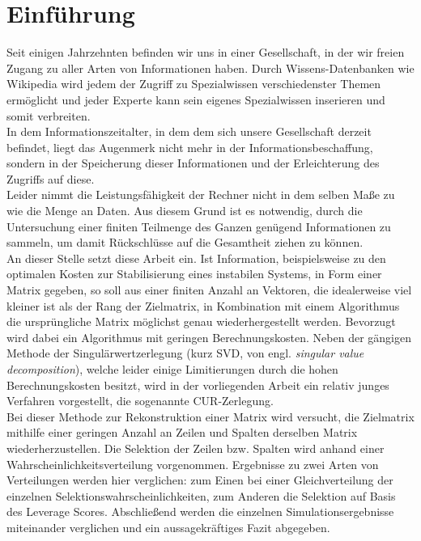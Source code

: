\documentclass[12pt,a4paper,twoside]{article}
\begin{document}
\newpage
\tableofcontents
\newpage

\pagestyle{headings}

\section{Einführung}
	Seit einigen Jahrzehnten befinden wir uns in einer Gesellschaft, in der wir freien Zugang zu aller Arten von 
	Informationen haben. Durch Wissens-Datenbanken wie Wikipedia wird jedem der Zugriff zu Spezialwissen verschiedenster Themen ermöglicht und jeder Experte kann sein eigenes Spezialwissen inserieren und somit verbreiten.
	\\
	In dem Informationszeitalter, in dem dem sich unsere Gesellschaft derzeit befindet, liegt das Augenmerk nicht 
	mehr in der Informationsbeschaffung, sondern in der Speicherung dieser Informationen und der Erleichterung des 
	Zugriffs auf diese. \\
	Leider nimmt die Leistungsfähigkeit der Rechner nicht in dem selben Maße zu wie die Menge an Daten. Aus diesem 
	Grund ist es notwendig, durch die Untersuchung einer finiten Teilmenge des Ganzen genügend Informationen zu 
	sammeln, um damit Rückschlüsse auf die Gesamtheit ziehen zu können. \\
	An dieser Stelle setzt diese Arbeit ein. Ist Information, beispielsweise zu den optimalen Kosten zur Stabilisierung eines instabilen Systems, in Form einer Matrix gegeben, so soll aus einer finiten Anzahl an Vektoren, die idealerweise viel kleiner ist als der Rang der Zielmatrix, in Kombination mit einem Algorithmus die ursprüngliche Matrix möglichst genau wiederhergestellt werden. Bevorzugt wird dabei ein Algorithmus mit geringen Berechnungskosten.
	Neben der gängigen Methode der Singulärwertzerlegung (kurz SVD, von engl. \textit{singular value decomposition}), welche leider einige Limitierungen durch die hohen Berechnungskosten besitzt, wird in der vorliegenden Arbeit ein relativ junges Verfahren vorgestellt, die sogenannte CUR-Zerlegung. \\
	Bei dieser Methode zur Rekonstruktion einer Matrix wird versucht, die Zielmatrix mithilfe einer geringen Anzahl an Zeilen und Spalten derselben Matrix wiederherzustellen. Die Selektion der Zeilen bzw. Spalten wird anhand einer Wahrscheinlichkeitsverteilung vorgenommen. Ergebnisse zu zwei Arten von Verteilungen werden hier verglichen: zum Einen bei einer Gleichverteilung der einzelnen Selektionswahrscheinlichkeiten, zum Anderen die Selektion auf Basis des Leverage Scores. Abschließend werden die einzelnen Simulationsergebnisse miteinander verglichen und ein aussagekräftiges Fazit abgegeben.
	\newpage
\end{document}
